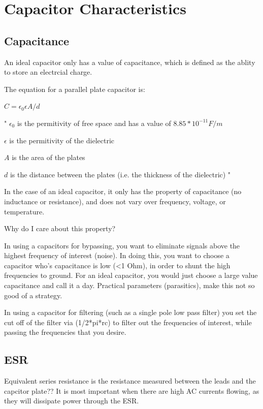 \section{Capacitor Characteristics}
\subsection{Capacitance}
An ideal capacitor only has a value of capacitance, which is defined as the ablity to store an electrcial charge. 

The equation for a parallel plate capacitor is:

$C = \epsilon _0\epsilon A/d$

"
$\epsilon _0$ is the permitivity of free space and has a value of $8.85 * 10^{-11} F/m$

$\epsilon$ is the permitivity of the dielectric

$A$ is the area of the plates

$d$ is the distance between the plates (i.e. the thickness of the dielectric)
"

In the case of an ideal capacitor, it only has the property of capacitance (no inductance or resistance), and does not vary over frequency, voltage, or temperature.  \cite{disc_comp}

Why do I care about this property?

In using a capacitors for bypassing, you want to eliminate signals above the highest frequency of interest (noise). In doing this, you want to choose a capacitor who's capacitance is low (<1 Ohm), in order to shunt the high frequencies to ground. For an ideal capacitor, you would just choose a large value capacitance and call it a day. Practical parameters (parasitics), make this not so good of a strategy. 

In using a capacitor for filtering (such as a single pole low pass filter) you set the cut off of the filter via (1/2*pi*rc) to filter out the frequencies of interest, while passing the frequencies that you desire. 

\subsection{ESR}

Equivalent series resistance is the resistance measured between the leads and the capcitor plate?? It is most important when there are high AC currents flowing, as they will dissipate power through the ESR. 
\cite{anal_capProps}

